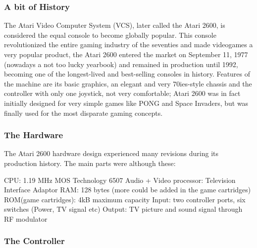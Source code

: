 \documentclass[a4paper,10pt]{book}
\begin{document}
 \subsubsection{A bit of History }
 
            The Atari Video Computer System (VCS), later called the Atari 2600, is considered the equal console to become
            globally popular. This console revolutionized the entire gaming industry of the seventies and made videogames
            a very popular product, the Atari 2600 entered the market on September 11, 1977 (nowadays a not too lucky yearbook)
            and remained in production until 1992, becoming one of the longest-lived and best-selling consoles in history.
            Features of the machine are its basic graphics, an elegant and very 70ies-style chassis and the controller with only
            one joystick, not very comfortable;
            Atari 2600 was in fact initially designed for very simple games like PONG and Space Invaders, but was
            finally used for the most disparate gaming concepts.
         
 \subsubsection{The Hardware }
 
            The Atari 2600 hardware design experienced many revisions during its production history.
            The main parts were although these:
         
 CPU: 1.19 MHz MOS Technology 6507 
 Audio + Video processor: Television Interface Adaptor 
 RAM: 128 bytes (more could be added in the game cartridges) 
 ROM(game cartridges): 4kB maximum capacity 
 Input: two controller ports, six switches (Power, TV signal etc) 
 Output: TV picture and sound signal through RF modulator 
 
 
 \subsubsection{The Controller }
 
\end{document}
